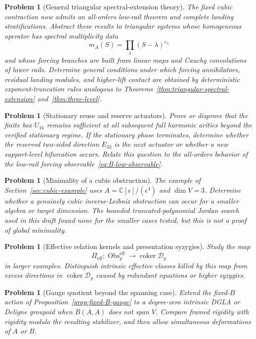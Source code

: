 \documentclass[11pt]{amsart}
\newtheorem{problem}[theorem]{Problem}
\newcommand{\coker}{\operatorname{coker}}
\newcommand{\Obs}{\operatorname{Obs}}
\newcommand{\cD}{\mathscr D}
\newcommand{\C}{\mathbb C}
\begin{document}
\begin{problem}[General triangular spectral-extension theory]
The fixed cubic contraction now admits an all-orders low-rail theorem and complete landing stratifications.  Abstract these results to triangular systems whose homogeneous operator has spectral multiplicity data
\[
m_A(S)=\prod_\lambda(S-\lambda)^{e_\lambda}
\]
and whose forcing branches are built from linear maps and Cauchy convolutions of lower rails.  Determine general conditions under which forcing annihilators, residual landing modules, and higher-lift contact are obtained by deterministic exponent-truncation rules analogous to Theorems~\ref{thm:triangular-spectral-extension} and~\ref{thm:three-level}.
\end{problem}

\begin{problem}[Stationary reuse and reserve actuators]
Prove or disprove that the finite box $U_{16}$ remains sufficient at all subsequent full harmonic arities beyond the verified stationary regime.  If the stationary phase terminates, determine whether the reserved two-sided direction $E_{33}$ is the next actuator or whether a new support-level bifurcation occurs.  Relate this question to the all-orders behavior of the low-rail forcing observable~\eqref{eq:B-low-observable}.
\end{problem}

\begin{problem}[Minimality of a cubic obstruction]
The example of Section~\ref{sec:cubic-example} uses $A=\C[\epsilon]/(\epsilon^4)$ and $\dim V=3$.  Determine whether a genuinely cubic inverse-Leibniz obstruction can occur for a smaller algebra or target dimension.  The bounded truncated-polynomial Jordan search used in this draft found none for the smaller cases tested, but this is not a proof of global minimality.
\end{problem}

\begin{problem}[Effective relation kernels and presentation syzygies]
Study the map
\[
\overline\Pi_{\mathrm{eff}}:\Obs^{\mathrm{eff}}_p\longrightarrow\coker\cD_p
\]
in larger examples.  Distinguish intrinsic effective classes killed by this map from excess directions in $\coker\cD_p$ caused by redundant equations or higher syzygies.
\end{problem}

\begin{problem}[Gauge quotient beyond the spanning case]
Extend the fixed-$B$ action of Proposition~\ref{prop:fixed-B-gauge} to a degree-zero intrinsic DGLA or Deligne groupoid when $B(A,A)$ does not span $V$.  Compare framed rigidity with rigidity modulo the resulting stabilizer, and then allow simultaneous deformations of $A$ or $B$.
\end{problem}
\end{document}
